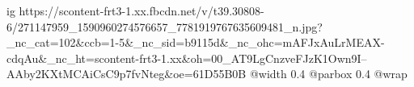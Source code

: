  
 
 
 
 

\ifcmt
  ig https://scontent-frt3-1.xx.fbcdn.net/v/t39.30808-6/271147959_1590960274576657_7781919767635609481_n.jpg?_nc_cat=102&ccb=1-5&_nc_sid=b9115d&_nc_ohc=mAFJxAuLrMEAX-cdqAu&_nc_ht=scontent-frt3-1.xx&oh=00_AT9LgCnzveFJzK1Own9I--AAby2KXtMCAiCsC9p7fvNteg&oe=61D55B0B
  @width 0.4
  @parbox 0.4
  @wrap \parpic[r]
\fi
